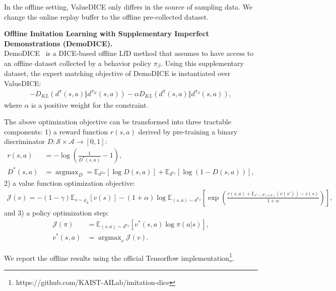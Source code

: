 In the offline setting, ValueDICE only differs in the source of sampling data. We change the online replay buffer to the offline pre-collected dataset. 

\textbf{Offline Imitation Learning with Supplementary Imperfect Demonstrations (DemoDICE).} \\ 
DemoDICE~\citep{kim2022demodice} is a DICE-based offline LfD method that assumes to have access to an offline dataset collected by a behavior policy $\pi_\beta$.
Using this supplementary dataset, the expert matching objective of DemoDICE is instantiated over ValueDICE:
\begin{align}
- D_{KL}(d^{\pi}(s,a) \Vert d^{\pi_E}(s,a)) - \alpha D_{KL}(d^{\pi}(s,a) \Vert d^{\pi_\beta}(s,a)), \nonumber
\end{align}
where $\alpha$ is a positive weight for the constraint. 

The above optimization objective can be transformed into three tractable components:
1) a reward function $r(s,a)$ derived by pre-training a binary discriminator $D:\mathcal{S}\times\mathcal{A} \rightarrow \left[0,1 \right]$: 
\begin{align}
r(s,a) &=-\log(\frac{1}{D^*(s,a)}-1), \nonumber \\
D^*(s,a) &= \mathop{\arg\max}_D = \mathbb{E}_{d^{\pi_E}} \left[ \log D(s,a) \right] + \mathbb{E}_{d^{\pi_\beta}} \left[ \log (1-D(s,a)) \right],  \nonumber
\end{align}
2) a value function optimization objective:
\begin{align}
\mathcal{J}(v)=-(1-\gamma) \mathbb{E}_{s \sim \rho_0}\left[ v(s) \right] - (1+\alpha) \log \mathbb{E}_{(s,a) \sim d^{\pi_\beta}}\left[ \exp(\frac{r(s,a)+\mathbb{E}_{s' \sim P(s,a)}(v(s'))-v(s)}{1+\alpha}) \right], \nonumber
\end{align}
and 3) a policy optimization step:
\begin{align}
\mathcal{J}(\pi) &= \mathbb{E}_{(s,a)\sim d^{\pi_\beta}} \left[ v^*(s,a) \log\pi(a \vert s) \right], \nonumber \\
v^*(s,a) &= \mathop{\arg \max}_v \mathcal{J}(v). \nonumber
\end{align}

We report the offline results using the official Tensorflow implementation\footnote{https://github.com/KAIST-AILab/imitation-dice}. 

